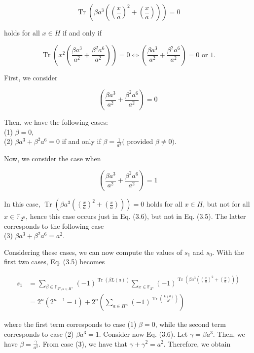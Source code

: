 \documentclass[10pt]{article}
\begin{document}
$$
\operatorname{Tr}\left(\beta a^{3}\left(\left(\frac{x}{a}\right)^{2}+\left(\frac{x}{a}\right)\right)\right)=0
$$

holds for all $x \in H$ if and only if

$$
\operatorname{Tr}\left(x^{2}\left(\frac{\beta a^{3}}{a^{2}}+\frac{\beta^{2} a^{6}}{a^{2}}\right)\right)=0 \Longleftrightarrow\left(\frac{\beta a^{3}}{a^{2}}+\frac{\beta^{2} a^{6}}{a^{2}}\right)=0 \text { or } 1 .
$$

First, we consider

$$
\left(\frac{\beta a^{3}}{a^{2}}+\frac{\beta^{2} a^{6}}{a^{2}}\right)=0
$$

Then, we have the following cases:\\
(1) $\beta=0$,\\
(2) $\beta a^{3}+\beta^{2} a^{6}=0$ if and only if $\beta=\frac{1}{a^{3}}($ provided $\beta \neq 0)$.

Now, we consider the case when

$$
\left(\frac{\beta a^{3}}{a^{2}}+\frac{\beta^{2} a^{6}}{a^{2}}\right)=1
$$

In this case, $\operatorname{Tr}\left(\beta a^{3}\left(\left(\frac{x}{a}\right)^{2}+\left(\frac{x}{a}\right)\right)\right)=0$ holds for all $x \in H$, but not for all $x \in \mathbb{F}_{2^{n}}$, hence this case occurs just in Eq. (3.6), but not in Eq. (3.5). The latter corresponds to the following case\\
(3) $\beta a^{3}+\beta^{2} a^{6}=a^{2}$.

Considering these cases, we can now compute the values of $s_{1}$ and $s_{0}$. With the first two cases, Eq. (3.5) becomes


\begin{align*}
s_{1} & =\sum_{\beta \in \mathbb{F}_{2^{n}, a \in H^{\times}}}(-1)^{\operatorname{Tr}(\beta L(a))} \sum_{x \in \mathbb{F}_{2^{n}}}(-1)^{\operatorname{Tr}\left(\beta a^{3}\left(\left(\frac{x}{a}\right)^{2}+\left(\frac{x}{a}\right)\right)\right)} \\
& =2^{n}\left(2^{n-1}-1\right)+2^{n}\left(\sum_{a \in H^{\times}}(-1)^{\operatorname{Tr}\left(\frac{L(a)}{a^{3}}\right)}\right) \tag{3.7}
\end{align*}


where the first term corresponds to case (1) $\beta=0$, while the second term corresponds to case (2) $\beta a^{3}=1$. Consider now Eq. (3.6). Let $\gamma=\beta a^{3}$. Then, we have $\beta=\frac{\gamma}{a^{3}}$. From case (3), we have that $\gamma+\gamma^{2}=a^{2}$. Therefore, we obtain
\end{document}
